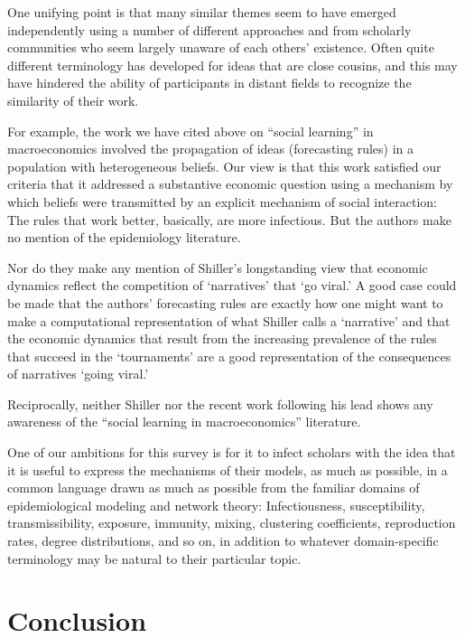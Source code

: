 One unifying point is that many similar themes seem to have emerged independently using a number of different approaches and from scholarly communities who seem largely unaware of each others' existence.  Often quite different terminology has developed for ideas that are close cousins, and this may have hindered the ability of participants in distant fields to recognize the similarity of their work.

For example, the work we have cited above on ``social learning'' in macroeconomics involved the propagation of ideas (forecasting rules) in a population with heterogeneous beliefs.  Our view is that this work satisfied our criteria that it addressed a substantive economic question using a mechanism by which beliefs were transmitted by an explicit mechanism of social interaction: The rules that work better, basically, are more infectious.  But the authors make no mention of the epidemiology literature.

Nor do they make any mention of Shiller's longstanding view that economic dynamics reflect the competition of `narratives' that `go viral.'  A good case could be made that the authors' forecasting rules are exactly how one might want to make a computational representation of what Shiller calls a `narrative' and that the economic dynamics that result from the increasing prevalence of the rules that succeed in the `tournaments' are a good representation of the consequences of narratives `going viral.'

Reciprocally, neither Shiller nor the recent work following his lead shows any awareness of the ``social learning in macroeconomics'' literature.

One of our ambitions for this survey is for it to infect scholars with the idea that it is useful to express the mechanisms of their models, as much as possible, in a common language drawn as much as possible from the familiar domains of epidemiological modeling and network theory:  Infectiousness, susceptibility, transmissibility, exposure, immunity, mixing, clustering coefficients, reproduction rates, degree distributions, and so on, in addition to whatever domain-specific terminology may be natural to their particular topic.

\section{Conclusion}

\newpage


